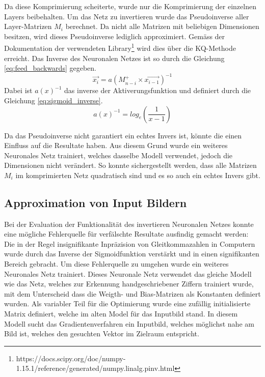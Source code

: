 \documentclass[Interploate_hadwritten_Digits.tex.tex]{subfiles}
\begin{document}
	Da diese Komprimierung scheiterte, wurde nur die Komprimierung der einzelnen Layers beibehalten. Um das Netz zu invertieren wurde das Pseudoinverse aller Layer-Matrizen $ M_{i} $ berechnet. Da nicht alle Matrizen mit beliebigen Dimensionen besitzen, wird dieses Pseudoinverse lediglich approximiert. Gemäss der Dokumentation der verwendeten Library\footnote{ https://docs.scipy.org/doc/numpy-1.15.1/reference/generated/numpy.linalg.pinv.html} wird dies über die KQ-Methode erreicht. Das Inverse des Neuronalen Netzes ist so durch die Gleichung \ref{eq:feed_backwards} gegeben.
	\begin{equation}
		\vec{x_{i}} = a(M_{n-i}^{+} \times \vec{x_{i-1}})^{-1}
		\label{eq:feed_backwards}
	\end{equation}
	Dabei ist $ a(x)^{-1} $ das inverse der Aktiverungsfunktion und definiert durch die Gleichung \ref{eq:sigmoid_inverse}.
	\begin{equation}
		a(x)^{-1} = log_{e}(\frac{1}{x - 1})
		\label{eq:sigmoid_inverse}
	\end{equation}
	
	Da das Pseudoinverse nicht garantiert ein echtes Invers ist, könnte die einen Einfluss auf die Resultate haben. Aus diesem Grund wurde ein weiteres Neuronales Netz trainiert, welches dasselbe Modell verwendet, jedoch die Dimensionen nicht verändert. So konnte sichergestellt werden, dass alle Matrizen $ M_{i} $ im komprimierten Netz quadratisch sind und es so auch ein echtes Invers gibt.
	
	\subsection{Approximation von Input Bildern}
	Bei der Evaluation der Funktionalität des invertieren Neuronalen Netzes konnte eine mögliche Fehlerquelle für verfälschte Resultate ausfindig gemacht werden: Die in der Regel insignifikante Inpräzision von Gleitkommazahlen in Computern wurde durch das Inverse der Sigmoidfunktion verstärkt und in einen signifikanten Bereich gebracht. Um diese Fehlerquelle zu umgehen wurde ein weiteres Neuronales Netz trainiert. Dieses Neuronale Netz verwendet das gleiche Modell wie das Netz, welches zur Erkennung handgeschriebener Ziffern trainiert wurde, mit dem Unterscheid dass die Weigth- und Bias-Matrizen als Konstanten definiert wurden. Als variabler Teil für die Optimierung wurde eine zufällig initialisierte Matrix definiert, welche im alten Model für das Inputbild stand. In diesem Modell sucht das Gradientenverfahren ein Inputbild, welches möglichst nahe am Bild ist, welches den gesuchten Vektor im Zielraum entspricht.
	
\end{document}
